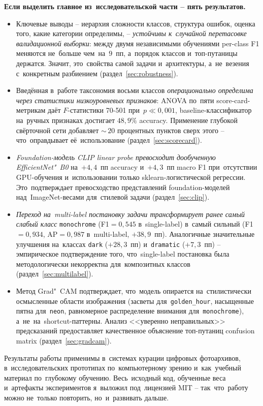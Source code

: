 \documentclass[a4paper,12pt]{diplom}
\begin{document}
\textbf{Если выделить главное из~исследовательской части -- пять результатов.}

\begin{itemize}
\item Ключевые выводы -- иерархия сложности классов, структура ошибок, оценка того, какие категории определимы, -- \emph{устойчивы к~случайной перетасовке валидационной выборки}: между двумя независимыми обучениями per-class F1 меняются не~больше чем~на~$9$~пп, а~порядок классов и~топ-путаницы держатся. Значит, это~свойства самой задачи и~архитектуры, а~не~везения с~конкретным разбиением (раздел~\ref{sec:robustness}).
\item Введённая в~работе таксономия восьми классов \emph{операционально определима через статистики низкоуровневых признаков}: ANOVA по~пяти score-card-метрикам даёт $F$-статистики 70-501 при~$p \ll 0{,}001$, baseline-классификатор на~ручных признаках достигает $48{,}9\%$ accuracy. Применение глубокой свёрточной сети добавляет $\sim$\,$20$ процентных пунктов сверх этого -- что~оправдывает её~использование (раздел~\ref{sec:scorecard}).
\item \emph{Foundation-модель CLIP linear probe превосходит дообученную EfficientNet"~B0} на~$+4{,}4$~пп accuracy и~$+4{,}3$~пп macro F1 при~отсутствии GPU-обучения и~использовании только sklearn-логистической регрессии. Это~подтверждает превосходство представлений foundation-моделей над~ImageNet-весами для~стилевой задачи (раздел~\ref{sec:clip}).
\item \emph{Переход на~multi-label постановку задачи трансформирует ранее самый слабый класс} \texttt{monochrome} (F1$=0{,}545$ в~single-label) в~самый сильный (F1$=0{,}934$, AP$=0{,}987$ в~multi-label, $+38{,}9$~пп). Аналогичные значительные улучшения на~классах \texttt{dark} ($+28{,}3$~пп) и~\texttt{dramatic} ($+7{,}3$~пп) -- эмпирическое подтверждение того, что~single-label постановка была методологически некорректна для~композитных классов (раздел~\ref{sec:multilabel}).
\item Метод Grad"~CAM подтверждает, что~модель опирается на~стилистически осмысленные области изображения (засветы для~\texttt{golden\_hour}, насыщенные пятна для~\texttt{neon}, равномерное распределение внимания для~\texttt{monochrome}), а~не~на~shortcut-паттерны. Анализ <<уверенно неправильных>> предсказаний предоставляет качественное объяснение топ-путаниц confusion matrix (раздел~\ref{sec:gradcam}).
\end{itemize}

Результаты работы применимы в~системах курации цифровых фотоархивов, в~исследовательских прототипах по~компьютерному зрению и~как~учебный материал по~глубокому обучению. Весь~исходный код, обученные веса и~артефакты экспериментов я~выложил под~лицензией MIT -- так~что~работу можно не~только повторить, но~и~развивать дальше.
\end{document}
